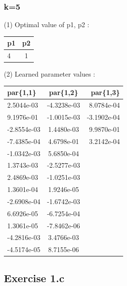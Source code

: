 \documentclass{article}
\begin{document}
\subsubsection*{k=5}
(1) Optimal value of p1, p2 :  \\
\begin{center}
	\begin{tabular}{ l | c }
		\hline
		p1 & p2 \\ \hline		
		4 & 1 \\ \hline
	\end{tabular}
\end{center}
(2) Learned parameter values : \\
\begin{center}
	\begin{tabular}{ l | c | r  }
		\hline
		par\{1,1\}& par\{1,2\} & par\{1,3\} \\
		\hline		
		2.5044e-03 & -4.3238e-03 & 8.0784e-04 \\ \hline
		9.1976e-01 & -1.0015e-03 & -3.1902e-04 \\ \hline
		-2.8554e-03 & 1.4480e-03 & 9.9870e-01 \\ \hline
		-7.4385e-04 & 4.6798e-01 & 3.2142e-04 \\ \hline
		-1.0342e-03 & 5.6850e-04 &  \\ \hline
		1.3743e-03 & -2.5277e-03 &  \\ \hline
		2.4869e-03 & -1.0251e-03 &  \\ \hline
		1.3601e-04 & 1.9246e-05 &  \\ \hline
		-2.6908e-04 & -1.6742e-03 &  \\ \hline
		6.6926e-05 & -6.7254e-04 &  \\ \hline
		1.3061e-05 & -7.8462e-06 &  \\ \hline
		-4.2816e-03 & 3.4766e-03 &  \\ \hline
		-4.5174e-05 & 8.7155e-06 &  \\ \hline
	\end{tabular}
\end{center}

\newpage
\subsection*{Exercise 1.c}
\end{document}
